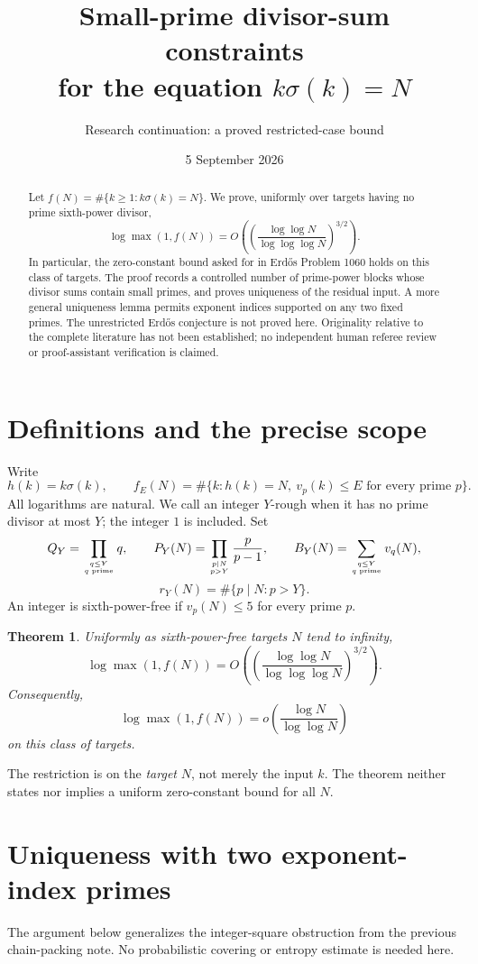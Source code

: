 \documentclass[11pt]{article}
\title{Small-prime divisor-sum constraints\texorpdfstring{\\}{ }for the equation \texorpdfstring{$k\sigma(k)=N$}{k sigma(k)=N}}
\author{Research continuation: a proved restricted-case bound}
\date{5 September 2026}
\newtheorem{theorem}{Theorem}[section]
\begin{document}
\maketitle
\begin{abstract}
Let $f(N)=\#\{k\ge1:k\sigma(k)=N\}$. We prove, uniformly over targets having no prime sixth-power divisor,
\[
 \log\max(1,f(N))
 =O\!\left(\left(\frac{\log\log N}{\log\log\log N}\right)^{3/2}\right).
\]
In particular, the zero-constant bound asked for in Erd\H{o}s Problem 1060 holds on this class of targets. The proof records a controlled number of prime-power blocks whose divisor sums contain small primes, and proves uniqueness of the residual input. A more general uniqueness lemma permits exponent indices supported on any two fixed primes. The unrestricted Erd\H{o}s conjecture is not proved here. Originality relative to the complete literature has not been established; no independent human referee review or proof-assistant verification is claimed.
\end{abstract}

\section{Definitions and the precise scope}
Write
\[
 h(k)=k\sigma(k),\qquad
 f_E(N)=\#\{k:h(k)=N,\ v_p(k)\le E\text{ for every prime }p\}.
\]
All logarithms are natural. We call an integer $Y$-rough when it has no prime divisor at most $Y$; the integer $1$ is included. Set
\[
 Q_Y=\prod_{q\le Y\atop q\text{ prime}}q,\qquad
 P_Y(N)=\prod_{p\mid N\atop p>Y}\frac{p}{p-1},\qquad
 B_Y(N)=\sum_{q\le Y\atop q\text{ prime}}v_q(N),
\]
\[
 r_Y(N)=\#\{p\mid N:p>Y\}.
\]
An integer is sixth-power-free if $v_p(N)\le5$ for every prime $p$.

\begin{theorem}\label{thm:main}
Uniformly as sixth-power-free targets $N$ tend to infinity,
\[
 \boxed{\log\max(1,f(N))
 =O\!\left(\left(\frac{\log\log N}{\log\log\log N}\right)^{3/2}\right).}
\]
Consequently,
\[
 \log\max(1,f(N))=o\!\left(\frac{\log N}{\log\log N}\right)
\]
on this class of targets.
\end{theorem}

The restriction is on the \emph{target} $N$, not merely the input $k$. The theorem neither states nor implies a uniform zero-constant bound for all $N$.

\section{Uniqueness with two exponent-index primes}
The argument below generalizes the integer-square obstruction from the previous chain-packing note. No probabilistic covering or entropy estimate is needed here.
\end{document}
